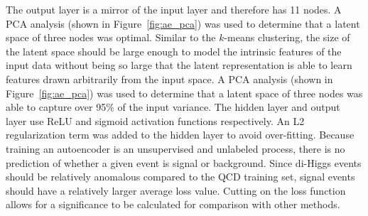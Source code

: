 The output layer is a mirror of the input layer and therefore has 11 nodes. A PCA analysis (shown in Figure~\ref{fig:ae_pca}) was used to determine that a latent space of three nodes was optimal. Similar to the $k$-means clustering, the size of the latent space should be large enough to model the intrinsic features of the input data without being so large that the latent representation is able to learn features drawn arbitrarily from the input space. A PCA analysis (shown in Figure~\ref{fig:ae_pca}) was used to determine that a latent space of three nodes was able to capture over 95\% of the input variance. The hidden layer and output layer use ReLU and sigmoid activation functions respectively. An L2 regularization term was added to the hidden layer to avoid over-fitting. %
Because training an autoencoder is an unsupervised and unlabeled process, there is no prediction of whether a given event is signal or background. Since di-Higgs events should be relatively anomalous compared to the QCD training set, signal events should have a relatively larger average loss value. Cutting on the loss function allows for a significance to be calculated for comparison with other methods.

